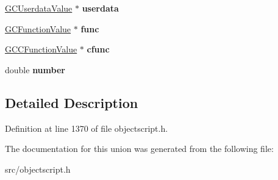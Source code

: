 \begin{DoxyCompactItemize}
\item 
\hyperlink{struct_object_script_1_1_o_s_1_1_core_1_1_g_c_userdata_value}{G\+C\+Userdata\+Value} $\ast$ {\bfseries userdata}\hypertarget{union_object_script_1_1_o_s_1_1_core_1_1_value_union_a3410db63ced340006dc9efa643a165c6}{}\label{union_object_script_1_1_o_s_1_1_core_1_1_value_union_a3410db63ced340006dc9efa643a165c6}

\item 
\hyperlink{struct_object_script_1_1_o_s_1_1_core_1_1_g_c_function_value}{G\+C\+Function\+Value} $\ast$ {\bfseries func}\hypertarget{union_object_script_1_1_o_s_1_1_core_1_1_value_union_a494631500e8067a3fe381c71c61f1dff}{}\label{union_object_script_1_1_o_s_1_1_core_1_1_value_union_a494631500e8067a3fe381c71c61f1dff}

\item 
\hyperlink{struct_object_script_1_1_o_s_1_1_core_1_1_g_c_c_function_value}{G\+C\+C\+Function\+Value} $\ast$ {\bfseries cfunc}\hypertarget{union_object_script_1_1_o_s_1_1_core_1_1_value_union_a5a3f032ebc546ec80baf6761372d45fe}{}\label{union_object_script_1_1_o_s_1_1_core_1_1_value_union_a5a3f032ebc546ec80baf6761372d45fe}

\item 
double {\bfseries number}\hypertarget{union_object_script_1_1_o_s_1_1_core_1_1_value_union_acee44745e705b0e4fc966fd781102665}{}\label{union_object_script_1_1_o_s_1_1_core_1_1_value_union_acee44745e705b0e4fc966fd781102665}

\end{DoxyCompactItemize}


\subsection{Detailed Description}


Definition at line 1370 of file objectscript.\+h.



The documentation for this union was generated from the following file\+:\begin{DoxyCompactItemize}
\item 
src/objectscript.\+h\end{DoxyCompactItemize}

